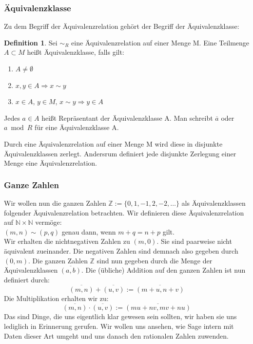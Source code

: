 \documentclass[fontsize=12pt,paper=a4,twoside,bibtotoc,idxtotoc,
liststotoc,pagesize,BCOR1.2cm,DIV15,chapterprefix,pagesize=pdftex]{scrbook}
\theoremstyle{plain}
\theoremstyle{definition}
\newtheorem{df}[equation]{Definition}
\theoremstyle{remark}
\begin{document}
\subsubsection{Äquivalenzklasse}
Zu dem Begriff der Äquivalenzrelation gehört der Begriff der Äquivalenzklasse:
\begin{df}
 Sei $\sim_R$ eine Äquivalenzrelation auf einer Menge M. Eine Teilmenge $A\subset M$ heißt Äquivalenzklasse, falls gilt:
\begin{enumerate}
 \item $A\neq\emptyset$
 \item $x,y\in A\Rightarrow x\sim y$
 \item $x\in A$, $y\in M$, $x\sim y\Rightarrow y\in A$
\end{enumerate}
Jedes $a\in A$ heißt Repräsentant der Äquivalenzklasse A. Man schreibt $\overline{a}$ oder $a\bmod R$ für eine Äquivalenzklasse A.
\end{df}
Durch eine Äquivalenzrelation auf einer Menge M wird diese in disjunkte Äquivalenzklassen zerlegt. Andersrum definiert jede disjunkte 
Zerlegung einer Menge eine Äquivalenzrelation. 
\subsubsection{Ganze Zahlen}
Wir wollen nun die ganzen Zahlen $\mathbb{Z}:=\{ 0,1,-1,2,-2,\dots \}$ als Äquivalenzklassen folgender Äquivalenzrelation betrachten.
Wir definieren diese Äquivalenzrelation auf $\mathbb{N} \times \mathbb{N}$ vermöge:\\
$(m,n) \sim (p,q)$ genau dann, wenn $m+q=n+p$ gilt.\\
Wir erhalten die nichtnegativen Zahlen zu $(m,0)$. Sie sind paarweise nicht äquivalent
zueinander. Die negativen Zahlen sind demnach also gegeben durch $(0,m)$. 
 Die ganzen Zahlen $\mathbb{Z}$ sind nun gegeben durch die Menge
der Äquivalenzklassen $\overline{(a,b)}$.
Die (übliche) Addition auf den ganzen Zahlen ist nun definiert durch:
\[
\overline{(m,n)}+\overline{(u,v)}:=\overline{(m+u,n+v)}\]
Die Multiplikation erhalten wir zu:
\[
\overline{(m,n)}\cdot\overline{(u,v)}:=\overline{(m u+nv,mv+nu)}
\]
Das sind Dinge, die uns eigentlich klar gewesen sein sollten, wir haben sie uns lediglich in Erinnerung gerufen. Wir wollen uns ansehen, 
wie Sage intern mit Daten dieser Art umgeht und uns danach den rationalen Zahlen zuwenden.
\end{document}
